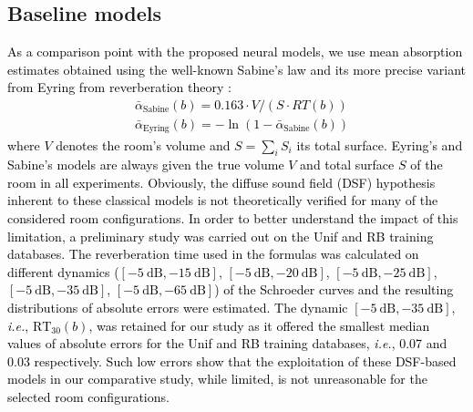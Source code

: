 \documentclass[reprint]{JASA}
\begin{document}
\subsection{\label{sec:baseline}Baseline models}
\textcolor{black}{As a comparison point with the proposed neural models, we use mean absorption estimates obtained using the well-known Sabine's law and its more precise variant from Eyring from reverberation theory \cite{Kuttruff:09}:
	\begin{align}
		&\bar{\alpha}_{\textrm{Sabine}}(b) = 0.163\cdot V/(S\cdot RT(b)) \label{eq:sabine}\\
		&\bar{\alpha}_{\textrm{Eyring}}(b) = -\ln\left(1-\bar{\alpha}_{\textrm{Sabine}}(b)\right) \label{eq:eyring}
	\end{align}
	where $V$ denotes the room's volume and $S=\sum_i S_i$ its total surface. Eyring's and Sabine's models are always given the true volume $V$ and total surface $S$ of the room in all experiments. Obviously, the diffuse sound field (DSF) hypothesis inherent to these classical models is not theoretically verified for many of the considered room configurations. In order to better understand the impact of this limitation, a preliminary study was carried out on the Unif and RB training databases. The reverberation time used in the formulas was calculated on different dynamics ($[-5~\textrm{dB}, -15~\textrm{dB}]$, $[-5~\textrm{dB},-20~\textrm{dB}]$, $[-5~\textrm{dB}, -25~\textrm{dB}]$, $[-5~\textrm{dB}, -35~\textrm{dB}]$, $[-5~\textrm{dB}, -65~\textrm{dB}]$) of the Schroeder curves \cite{Schroeder:65} and the resulting distributions of absolute errors were estimated. The dynamic $[-5~\textrm{dB}, -35~\textrm{dB}]$, \textit{i.e.}, $\textrm{RT}_{30}(b)$, was retained for our study as it offered the smallest median values of absolute errors for the Unif and RB training databases, \textit{i.e.}, 0.07 and 0.03 respectively. Such low errors show that the exploitation of these DSF-based models in our comparative study, while limited, is not unreasonable for the selected room configurations.}

\end{document}
